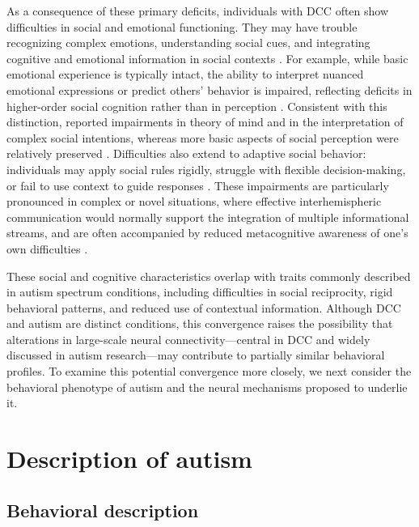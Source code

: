 \documentclass{article}
\begin{document}
As a consequence of these primary deficits, individuals with DCC often show difficulties in social and emotional functioning. They may have trouble recognizing complex emotions, understanding social cues, and integrating cognitive and emotional information in social contexts \citep{Paul2021,Bridgman2014,Anderson2017}. For example, while basic emotional experience is typically intact, the ability to interpret nuanced emotional expressions or predict others’ behavior is impaired, reflecting deficits in higher-order social cognition rather than in perception \citep{Paul2021}. Consistent with this distinction, \citet{Symington2010} reported impairments in theory of mind and in the interpretation of complex social intentions, whereas more basic aspects of social perception were relatively preserved \citep{Symington2010}. Difficulties also extend to adaptive social behavior: individuals may apply social rules rigidly, struggle with flexible decision-making, or fail to use context to guide responses \citep{Brown2021,Mangum2021,Marco2012}. These impairments are particularly pronounced in complex or novel situations, where effective interhemispheric communication would normally support the integration of multiple informational streams, and are often accompanied by reduced metacognitive awareness of one’s own difficulties \citep{Mangum2018,Mangum2021}.

These social and cognitive characteristics overlap with traits commonly described in autism spectrum conditions, including difficulties in social reciprocity, rigid behavioral patterns, and reduced use of contextual information. Although DCC and autism are distinct conditions, this convergence raises the possibility that alterations in large-scale neural connectivity—central in DCC and widely discussed in autism research—may contribute to partially similar behavioral profiles. To examine this potential convergence more closely, we next consider the behavioral phenotype of autism and the neural mechanisms proposed to underlie it.

\section{Description of autism}

\subsection{Behavioral description}
\end{document}
